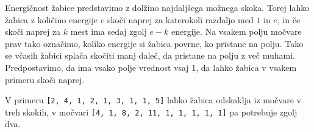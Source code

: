 \documentclass[arhiv]{../izpit}
\begin{document}
Energičnost žabice predstavimo z dolžino najdaljšega možnega skoka. Torej lahko žabica z količino energije $e$ skoči naprej za katerokoli razdaljo med $1$ in $e$, in če skoči naprej za $k$ mest ima sedaj zgolj $e - k$ energije. Na vsakem polju močvare prav tako označimo, koliko energije si žabica povrne, ko pristane na polju. Tako se včasih žabici splača skočiti manj daleč, da pristane na polju z več muhami. Predpostavimo, da ima vsako polje vrednost vsaj $1$, da lahko žabica v vsakem primeru skoči naprej.

V primeru \verb|[2, 4, 1, 2, 1, 3, 1, 1, 5]| lahko žabica odskaklja iz močvare v treh skokih, v močvari \verb|[4, 1, 8, 2, 11, 1, 1, 1, 1, 1]| pa potrebuje zgolj dva.
\end{document}
